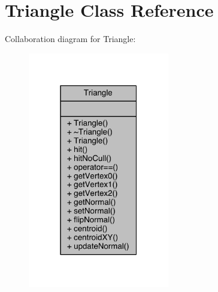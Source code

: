 \hypertarget{class_triangle}{}\section{Triangle Class Reference}
\label{class_triangle}


Collaboration diagram for Triangle\+:
\nopagebreak
\begin{figure}[H]
\begin{center}
\leavevmode
\includegraphics[width=175pt]{doxygen/latex/class_triangle__coll__graph}
\end{center}
\end{figure}
